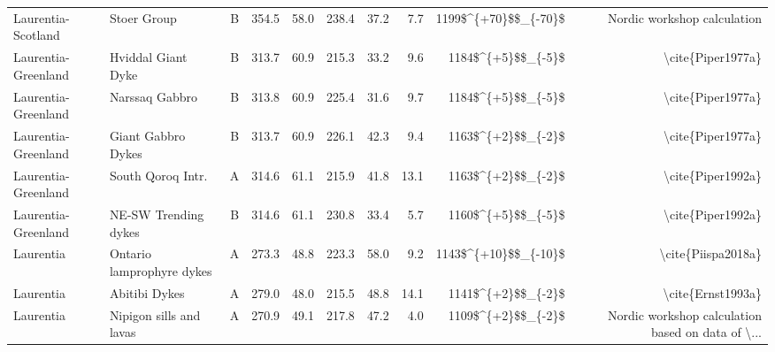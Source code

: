 \begin{longtable}{p{1 in}p{1 in}rrrrrrrr}
            Laurentia-Scotland &                                      Stoer Group &      B &     354.5 &      58.0 & 238.4 &  37.2 &       7.7 &   1199\$\textasciicircum \{+70\}\$\$\_\{-70\}\$ &                        Nordic workshop calculation \\
           Laurentia-Greenland &                               Hviddal Giant Dyke &      B &     313.7 &      60.9 & 215.3 &  33.2 &       9.6 &     1184\$\textasciicircum \{+5\}\$\$\_\{-5\}\$ &                                  \textbackslash cite\{Piper1977a\} \\
           Laurentia-Greenland &                                   Narssaq Gabbro &      B &     313.8 &      60.9 & 225.4 &  31.6 &       9.7 &     1184\$\textasciicircum \{+5\}\$\$\_\{-5\}\$ &                                  \textbackslash cite\{Piper1977a\} \\
           Laurentia-Greenland &                               Giant Gabbro Dykes &      B &     313.7 &      60.9 & 226.1 &  42.3 &       9.4 &     1163\$\textasciicircum \{+2\}\$\$\_\{-2\}\$ &                                  \textbackslash cite\{Piper1977a\} \\
           Laurentia-Greenland &                                South Qoroq Intr. &      A &     314.6 &      61.1 & 215.9 &  41.8 &      13.1 &     1163\$\textasciicircum \{+2\}\$\$\_\{-2\}\$ &                                  \textbackslash cite\{Piper1992a\} \\
           Laurentia-Greenland &                             NE-SW Trending dykes &      B &     314.6 &      61.1 & 230.8 &  33.4 &       5.7 &     1160\$\textasciicircum \{+5\}\$\$\_\{-5\}\$ &                                  \textbackslash cite\{Piper1992a\} \\
                     Laurentia &                        Ontario lamprophyre dykes &      A &     273.3 &      48.8 & 223.3 &  58.0 &       9.2 &   1143\$\textasciicircum \{+10\}\$\$\_\{-10\}\$ &                                 \textbackslash cite\{Piispa2018a\} \\
                     Laurentia &                                    Abitibi Dykes &      A &     279.0 &      48.0 & 215.5 &  48.8 &      14.1 &     1141\$\textasciicircum \{+2\}\$\$\_\{-2\}\$ &                                  \textbackslash cite\{Ernst1993a\} \\
                     Laurentia &                          Nipigon sills and lavas &      A &     270.9 &      49.1 & 217.8 &  47.2 &       4.0 &     1109\$\textasciicircum \{+2\}\$\$\_\{-2\}\$ &  Nordic workshop calculation based on data of \textbackslash ... \\

\end{longtable}
